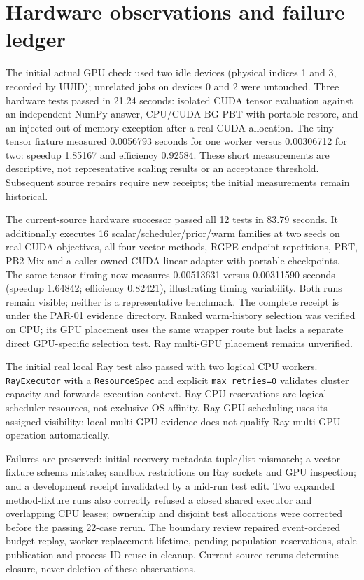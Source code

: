 \section{Hardware observations and failure ledger}
The initial actual GPU check used two idle devices (physical indices 1 and 3,
recorded by UUID); unrelated jobs on devices 0 and 2 were untouched. Three
hardware tests passed in 21.24 seconds: isolated CUDA tensor evaluation against
an independent NumPy answer, CPU/CUDA BG-PBT with portable restore, and an
injected out-of-memory exception after a real CUDA allocation. The tiny tensor
fixture measured 0.0056793 seconds for one worker versus 0.00306712 for two:
speedup 1.85167 and efficiency 0.92584. These short measurements are descriptive,
not representative scaling results or an acceptance threshold. Subsequent
source repairs require new receipts; the initial measurements remain historical.

The current-source hardware successor passed all 12 tests in 83.79 seconds.
It additionally executes 16 scalar/scheduler/prior/warm families at two seeds
on real CUDA objectives, all four vector methods, RGPE endpoint repetitions,
PBT, PB2-Mix and a caller-owned CUDA linear adapter with portable checkpoints.
The same tensor timing now measures 0.00513631 versus 0.00311590 seconds
(speedup 1.64842; efficiency 0.82421), illustrating timing variability. Both
runs remain visible; neither is a representative benchmark. The complete
receipt is  under the
PAR-01 evidence directory. Ranked warm-history selection was verified on CPU;
its GPU placement uses the same wrapper route but lacks a separate direct
GPU-specific selection test. Ray multi-GPU placement remains unverified.

The initial real local Ray test also passed with two logical CPU workers.
\texttt{RayExecutor} with a \texttt{ResourceSpec} and explicit \texttt{max\_retries=0} validates
cluster capacity and forwards execution context. Ray CPU reservations are
logical scheduler resources, not exclusive OS affinity. Ray GPU scheduling
uses its assigned visibility; local multi-GPU evidence does not qualify Ray
multi-GPU operation automatically.

Failures are preserved: initial recovery metadata tuple/list mismatch;
a vector-fixture schema mistake; sandbox restrictions on Ray sockets and GPU
inspection; and a development receipt invalidated by a mid-run test edit. Two expanded method-fixture runs also correctly refused a closed shared executor and overlapping CPU leases; ownership and disjoint test allocations were corrected before the passing 22-case rerun.
The boundary review repaired event-ordered budget replay, worker replacement
lifetime, pending population reservations, stale publication and process-ID
reuse in cleanup. Current-source reruns determine closure, never deletion of
these observations.

